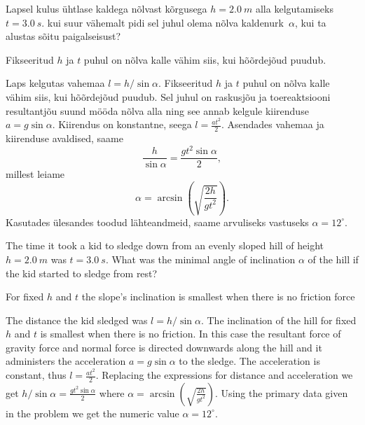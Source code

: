 
Lapsel kulus ühtlase kaldega nõlvast kõrgusega $h=\SI{2,0}{m}$ alla
kelgutamiseks $t=\SI{3,0}{s}$. kui suur vähemalt pidi sel juhul olema nõlva
kaldenurk~$\alpha$, kui ta alustas sõitu paigalseisust?

\hint
Fikseeritud $h$ ja $t$ puhul on nõlva kalle vähim siis, kui hõõrdejõud puudub.

\solu
Laps kelgutas vahemaa $l=h / \sin \alpha$. Fikseeritud $h$ ja $t$ puhul on nõlva kalle vähim siis, kui hõõrdejõud puudub. Sel juhul on raskusjõu ja toereaktsiooni resultantjõu suund mööda nõlva alla ning see annab kelgule kiirenduse $a=g \sin \alpha$. Kiirendus on konstantne, seega $l=\frac{a t^2}{2}$. Asendades vahemaa ja kiirenduse avaldised, saame
\[
\frac{h}{\sin\alpha} = \frac{g t^2 \sin \alpha}{2},
\]
millest leiame
\[
\alpha = \arcsin\left( \sqrt{\frac{2h}{g t^2}}\right).
\]
Kasutades ülesandes toodud lähteandmeid, saame arvuliseks vastuseks $\alpha = 12^\circ$. 

The time it took a kid to sledge down from an evenly sloped hill of height $h=\SI{2,0}{m}$ was $t=\SI{3,0}{s}$. What was the minimal angle of inclination $\alpha$ of the hill if the kid started to sledge from rest?

\hinteng
For fixed $h$ and $t$ the slope’s inclination is smallest when there is no friction force

\solueng
The distance the kid sledged was $l=h / \sin \alpha$. The inclination of the hill for fixed $h$ and $t$ is smallest when there is no friction. In this case the resultant force of gravity force and normal force is directed downwards along the hill and it administers the acceleration $a=g \sin \alpha$ to the sledge. The acceleration is constant, thus $l=\frac{a t^2}{2}$. Replacing the expressions for distance and acceleration we get $h / \sin \alpha = \frac{g t^2 \sin \alpha}{2}$ where $\alpha = \arcsin( \sqrt{\frac{2h}{g t^2}})$. Using the primary data given in the problem we get the numeric value $\alpha = 12^\circ$.
\probend